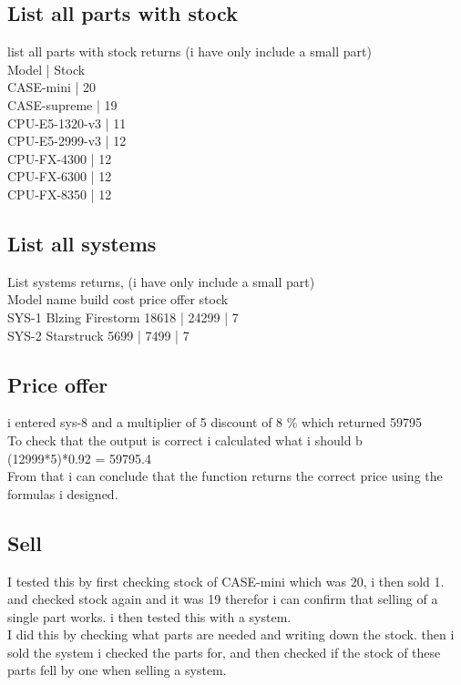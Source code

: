 \documentclass[a4paper,10pt,titlepage]{report}
\begin{document}
\subsection{List all parts with stock}
list all parts with stock returns (i have only include a small part) \\
Model                         | Stock \\
CASE-mini                     | 20\\ 
CASE-supreme                  | 19\\
CPU-E5-1320-v3                | 11\\
CPU-E5-2999-v3                | 12\\
CPU-FX-4300                   | 12\\
CPU-FX-6300                   | 12\\
CPU-FX-8350                   | 12\\
\vspace{5 mm}
\subsection{List all systems}
List systems returns, (i have only include a small part)\\
Model                         name                          build cost     price offer stock \\
SYS-1                         Blzing Firestorm              18618      |    24299    |   7\\
SYS-2                         Starstruck                    5699      |    7499    |   7\\
\vspace{5 mm}
\subsection{Price offer}
i entered sys-8 and a multiplier of 5 discount of 8 \% which returned 59795 \\
To check that the output is correct i calculated what i should b \\
(12999*5)*0.92 = 59795.4 \\
From that i can conclude that the function returns the correct price using the formulas i designed. \\
\vspace{5 mm}
\subsection{Sell}
I tested this by first checking stock of CASE-mini which was 20, i then sold 1. and checked stock again and it was 19 therefor i can confirm that selling of a single part works. i then tested this with a system. \\
I did this by checking what parts are needed and writing down the stock. then i sold the system i checked the parts for, and then checked if the stock of these parts fell by one when selling a system.
\\
\vspace{5 mm}
\end{document}
